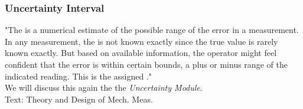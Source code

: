 \documentclass[fleqn]{beamer} %
\newcommand{\sectiontitleIV}{Uncertainty Interval}
\begin{document}
\begin{frame}[label=sectionIV]
\frametitle{\sectiontitleIV}

"The \hspcuu is a numerical estimate of the possible range of the error in a measurement. In any
measurement, the \hspcuu is not known exactly since the true value is rarely known exactly. But based on
available information, the operator might feel confident that the error is within certain bounds, a plus
or minus range of the indicated reading. This is the assigned \hspcuu."\vspace{5mm}\\
We will discuss this again the the {\it Uncertainty Module}.\vspace{10mm}\\

{\tiny Text: Theory and Design of Mech. Meas.}
\end{frame}
\end{document}
